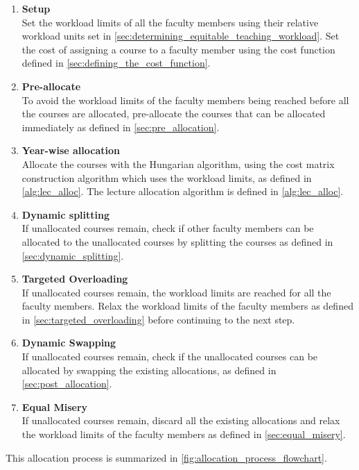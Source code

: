 \begin{enumerate}
  \item \textbf{Setup}\\
        Set the workload limits of all the faculty members using their relative workload units set in \autoref{sec:determining_equitable_teaching_workload}. Set the cost of assigning a course to a faculty member using the cost function defined in \autoref{sec:defining_the_cost_function}.
  \item \textbf{Pre-allocate}\\
        To avoid the workload limits of the faculty members being reached before all the courses are allocated, pre-allocate the courses that can be allocated immediately as defined in \autoref{sec:pre_allocation}.
  \item \textbf{Year-wise allocation}\\
        Allocate the courses with the Hungarian algorithm, using the cost matrix construction algorithm which uses the workload limits, as defined in \autoref{alg:lec_alloc}. The lecture allocation algorithm is defined in \autoref{alg:lec_alloc}.
  \item \textbf{Dynamic splitting}\\
        If unallocated courses remain, check if other faculty members can be allocated to the unallocated courses by splitting the courses as defined in \autoref{sec:dynamic_splitting}.
  \item \textbf{Targeted Overloading}\\
        If unallocated courses remain, the workload limits are reached for all the faculty members. Relax the workload limits of the faculty members as defined in \autoref{sec:targeted_overloading} before continuing to the next step.
  \item \textbf{Dynamic Swapping}\\
        If unallocated courses remain, check if the unallocated courses can be allocated by swapping the existing allocations, as defined in \autoref{sec:post_allocation}.
  \item \textbf{Equal Misery}\\
        If unallocated courses remain, discard all the existing allocations and relax the workload limits of the faculty members as defined in \autoref{sec:equal_misery}.
\end{enumerate}

This allocation process is summarized in \autoref{fig:allocation_process_flowchart}.


